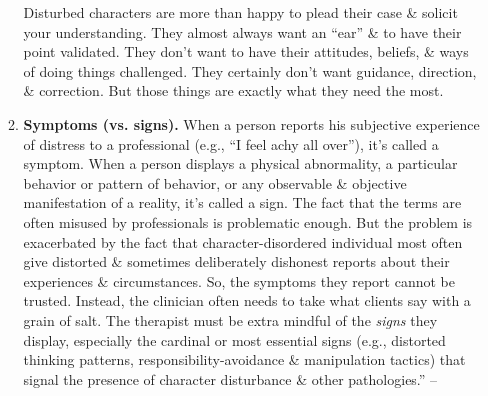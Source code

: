 \documentclass{article}
\numberwithin{equation}{section}
\begin{document}
\begin{itemize}
\begin{enumerate}
		Disturbed characters are more than happy to plead their case \& solicit your understanding. They almost always want an ``ear'' \& to have their point validated. They don't want to have their attitudes, beliefs, \& ways of doing things challenged. They certainly don't want guidance, direction, \& correction. But those things are exactly what they need the most.
		\item \textbf{Symptoms (vs. signs).} When a person reports his subjective experience of distress to a professional (e.g., ``I feel achy all over''), it's called a symptom. When a person displays a physical abnormality, a particular behavior or pattern of behavior, or any observable \& objective manifestation of a reality, it's called a sign. The fact that the terms are often misused by professionals is problematic enough. But the problem is exacerbated by the fact that character-disordered individual most often give distorted \& sometimes deliberately dishonest reports about their experiences \& circumstances. So, the symptoms they report cannot be trusted. Instead, the clinician often needs to take what clients say with a grain of salt. The therapist must be extra mindful of the \textit{signs} they display, especially the cardinal or most essential signs (e.g., distorted thinking patterns, responsibility-avoidance \& manipulation tactics) that signal the presence of character disturbance \& other pathologies.'' -- \cite[pp. 189--206]{Simon2011}
	\end{enumerate}
\end{itemize}
\end{document}
